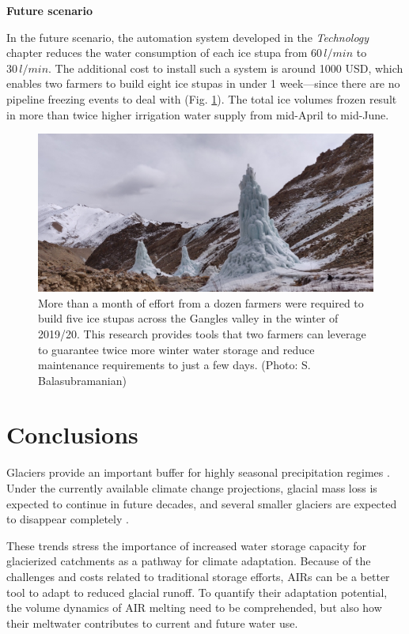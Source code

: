 \textbf{Future scenario}

In the future scenario, the automation system developed in the \textit{Technology} chapter reduces the water
consumption of each ice stupa from $60\,l/min$ to $30\,l/min$. The additional cost to install such a system is
around 1000 USD, which enables two farmers to build eight ice stupas in under 1 week---since there are no pipeline freezing events to deal with (Fig. \ref{fig:icestupa_valley}). The total ice
volumes frozen result in more than twice higher irrigation water supply from mid-April to
mid-June.

\begin{figure}[htb]
	\includegraphics[width=\textwidth]{figs/icestupa_valley}

  \caption{More than a month of effort from a dozen farmers were required to build five ice stupas across the
  Gangles valley in the winter of 2019/20. This research provides tools that two farmers can leverage to
  guarantee twice more winter water storage and reduce maintenance requirements to just a few days. (Photo:
  S. Balasubramanian)}

	\label{fig:icestupa_valley}
\end{figure}

\section{Conclusions}

Glaciers provide an important buffer for highly seasonal precipitation regimes
\citep{kaserContributionPotentialGlaciers2010}. Under the currently available climate change projections, glacial mass loss is expected to continue in future decades, and several smaller glaciers are expected to disappear completely \citep{rabatelCurrentStateGlaciers2013}.

These trends stress the importance of increased water storage capacity for glacierized catchments as a pathway
for climate adaptation. Because of the challenges and costs related to traditional storage efforts, \ac{AIRs} can
be a better tool to adapt to reduced glacial runoff. To quantify their adaptation potential, the volume dynamics of \ac{AIR} melting need to be comprehended, but also how their meltwater contributes to
current and future water use. 

